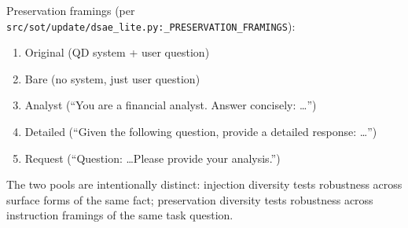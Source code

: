 \documentclass[11pt]{article}
\newcommand{\code}[1]{\texttt{\small #1}}
\begin{document}
Preservation framings (per
\code{src/sot/update/dsae\_lite.py:\_PRESERVATION\_FRAMINGS}):
\begin{enumerate}[leftmargin=*, itemsep=2pt]
  \item Original (QD system + user question)
  \item Bare (no system, just user question)
  \item Analyst (``You are a financial analyst. Answer concisely: \dots'')
  \item Detailed (``Given the following question, provide a detailed response: \dots'')
  \item Request (``Question: \dots Please provide your analysis.'')
\end{enumerate}

The two pools are intentionally distinct: injection diversity tests
robustness across surface forms of the same fact; preservation diversity
tests robustness across instruction framings of the same task question.



\end{document}

